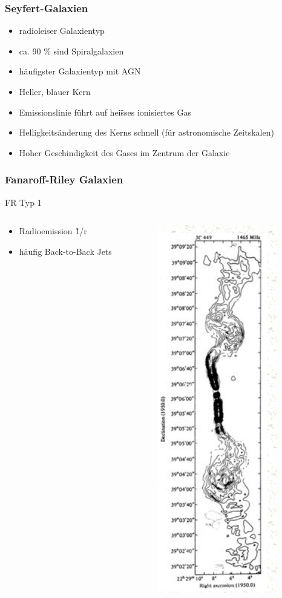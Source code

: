 \documentclass[aspectratio=1610, 9pt]{beamer}
\begin{document}
\begin{frame}\frametitle{Seyfert-Galaxien}
  \begin{itemize}
    \item radioleiser Galaxientyp
    \item ca. 90 \% sind Spiralgalaxien
    \item h\"aufigster Galaxientyp mit AGN
    \item Heller, blauer Kern
    \item Emissionslinie f\"uhrt auf hei\"sses ionisiertes Gas
    \item Helligkeits\"anderung des Kerns schnell (f\"ur astronomische Zeitskalen)
    \item Hoher Geschindigkeit des Gases im Zentrum der Galaxie
  \end{itemize}
\end{frame}

\begin{frame}\frametitle{Fanaroff-Riley Galaxien}
  \begin{block}{FR Typ 1}
  \begin{columns}
  \begin{column}{0.45\textwidth}
    \begin{itemize}
      \item Radioemission \~ 1/r
      \item h\"aufig Back-to-Back Jets
    \end{itemize}
  \end{column}
  \begin{column}{0.45\textwidth}
    \includegraphics{images/FR1.png}
  \end{column}
  \end{columns}
  \end{block}
\end{frame}
\end{document}
